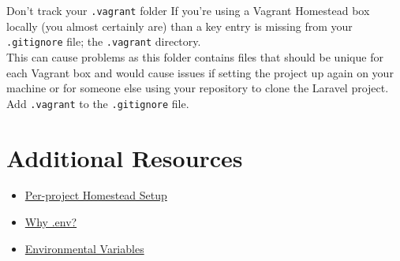 \begin{infobox}{Don't track your \texttt{.vagrant} folder}
    If you're using a Vagrant Homestead box locally (you almost certainly are) than a key entry is missing from your \texttt{.gitignore} file; the \texttt{.vagrant} directory.
    \\

    This can cause problems as this folder contains files that should be unique for each Vagrant box and would cause issues if setting the project up again on your machine or for someone else using your repository to clone the Laravel project.
    \\

    Add \texttt{.vagrant} to the \texttt{.gitignore} file.
\end{infobox}

\section{Additional Resources}

\begin{itemize}[leftmargin=*]
    \item \href{http://laravel.com/docs/master/homestead#per-project-installation}{Per-project Homestead Setup}
    \item \href{https://github.com/vlucas/phpdotenv#why-env}{Why .env?}
    \item \href{https://en.wikipedia.org/wiki/Environment\_variable}{Environmental Variables}
\end{itemize}
